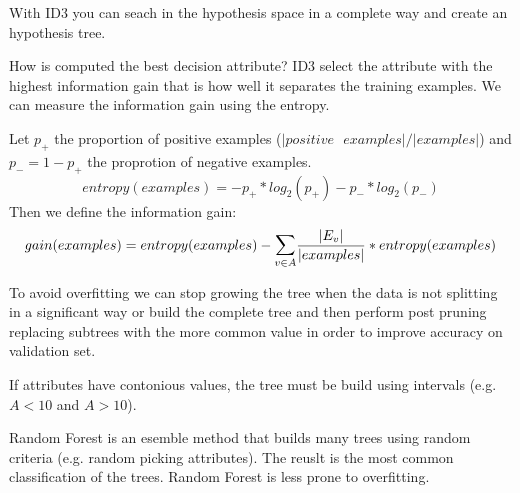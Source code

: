 With ID3 you can seach in the hypothesis space in a complete way and create an hypothesis tree.

How is computed the best decision attribute? ID3 select the attribute with the highest information gain that is how well it separates the training examples. We can measure the information gain using the entropy.

Let $p_+$ the proportion of positive examples ($|positive\text{ }examples|/|examples|$) and $p_- = 1 - p_+$ the proprotion of negative examples. 
\[
entropy(examples) = - p_+ * log_2(p_+) - p_- * log_2(p_-)
\]
Then we define the information gain:
\[
gain(examples) = entropy(examples) - \mathlarger{\sum}_{v \in A}\frac{|E_v|}{|examples|}*entropy(examples)
\]

To avoid overfitting we can stop growing the tree when the data is not splitting in a significant way or build the complete tree and then perform post pruning replacing subtrees with the more common value in order to improve accuracy on validation set.

If attributes have contonious values, the tree must be build using intervals (e.g. $A < 10$ and $A > 10$).

Random Forest is an esemble method that builds many trees using random criteria (e.g. random picking attributes). The reuslt is the most common classification of the trees. Random Forest is less prone to overfitting.


